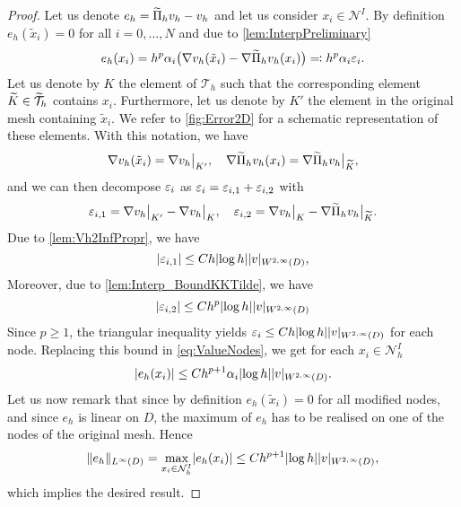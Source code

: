 \documentclass[10pt]{article}
\begin{document}
\begin{proof} Let us denote $e_h = \widetilde \Pi_h v_h - v_h$ and let us consider $x_i \in \mathcal N^I$. By definition $e_h(\tilde x_i) = 0$ for all $i = 0, \ldots, N$ and due to \cref{lem:InterpPreliminary}
	\begin{equation}\label{eq:ValueNodes}
		e_h(x_i) = h^p \alpha_i \big(\nabla v_h(\tilde x_i) - \nabla \widetilde \Pi_hv_h(x_i)\big)  \eqqcolon h^p \alpha_i\varepsilon_i.
	\end{equation}
	Let us denote by $K$ the element of $\mathcal T_h$ such that the corresponding element $\widetilde K \in \widetilde{\mathcal T}_h$ contains $x_i$. Furthermore, let us denote by $K'$ the element in the original mesh containing $\tilde x_i$. We refer to \cref{fig:Error2D} for a schematic representation of these elements. With this notation, we have 
	\begin{equation}
		\nabla v_h(\tilde x_i) = \nabla v_h\bigr\rvert_{K'}, \quad \nabla \widetilde \Pi_hv_h(x_i) = \nabla \widetilde \Pi_h v_h\bigr\rvert_{\widetilde K},
	\end{equation}
	and we can then decompose $\varepsilon_i$ as $\varepsilon_i = \varepsilon_{i,1} + \varepsilon_{i, 2}$ with
	\begin{equation}
		\varepsilon_{i, 1} = \nabla v_h\bigr\rvert_{K'} - \nabla v_h\bigr\rvert_{K}, \quad  \varepsilon_{i, 2} = \nabla v_h\bigr\rvert_{K}  - \nabla \widetilde \Pi_h v_h \bigr\rvert_{\widetilde K}.
	\end{equation}
	Due to \cref{lem:Vh2InfPropr}, we have 
	\begin{equation}\label{eq:boundEps1Proof2d}
	\lvert\varepsilon_{i, 1}\rvert \leq C h \lvert\log h\rvert \lvert v\rvert_{W^{2, \infty}(D)},
	\end{equation}
	Moreover, due to \cref{lem:Interp_BoundKKTilde}, we have
	\begin{equation}
		\lvert\varepsilon_{i, 2}\rvert \leq C h^p \lvert\log h\rvert \lvert v\rvert_{W^{2, \infty}(D)}
	\end{equation} 
	Since $p \geq 1$, the triangular inequality yields $\varepsilon_{i} \leq Ch \lvert\log h\rvert \lvert v\rvert_{W^{2, \infty}(D)}$ for each node. Replacing this bound in \eqref{eq:ValueNodes}, we get for each $x_i \in \mathcal N_h^I$
	\begin{equation}
		\lvert e_h(x_i)\rvert \leq C h^{p+1} \alpha_i \lvert\log h\rvert \lvert v\rvert_{W^{2, \infty}(D)}.
	\end{equation}
	Let us now remark that since by definition $e_h(\tilde x_i) = 0$ for all modified nodes, and since $e_h$ is linear on $D$, the maximum of $e_h$ has to be realised on one of the nodes of the original mesh. Hence
	\begin{equation}
		\lVert e_h\rVert_{L^{\infty}(D)} = \max_{x_i \in \mathcal N_h^{I}} \lvert e_h(x_i)\rvert \leq C h^{p+1} \lvert\log h\rvert \lvert v\rvert_{W^{2, \infty}(D)},
	\end{equation}
	which implies the desired result.
\end{proof}
\end{document}
